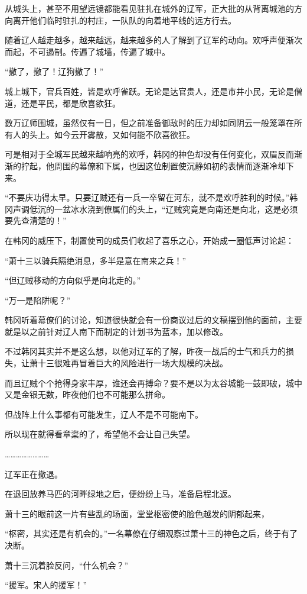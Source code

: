 从城头上，甚至不用望远镜都能看见驻扎在城外的辽军，正大批的从背离城池的方向离开他们临时驻扎的村庄，一队队的向着地平线的远方行去。

随着辽人越走越多，越来越远，越来越多的人了解到了辽军的动向。欢呼声便渐次而起，不可遏制。传遍了城墙，传遍了城中。

“撤了，撤了！辽狗撤了！”

城上城下，官兵百姓，皆是欢呼雀跃。无论是达官贵人，还是市井小民，无论是僧道，还是平民，都是欣喜欲狂。

数万辽师围城，虽然仅有一日，但之前准备御敌时的压力却如同阴云一般笼罩在所有人的头上。如今云开雾散，又如何能不欣喜欲狂。

可是相对于全城军民越来越响亮的欢呼，韩冈的神色却没有任何变化，双眉反而渐渐的拧起，他周围的幕僚和下属，也因这位制置使沉静如初的表情而逐渐冷却下来。

“不要庆功得太早。只要辽贼还有一兵一卒留在河东，就不是欢呼胜利的时候。”韩冈声调低沉的一盆冰水浇到僚属们的头上，“辽贼究竟是向南还是向北，这是必须要先查清楚的！”

在韩冈的威压下，制置使司的成员们收起了喜乐之心，开始成一圈低声讨论起：

“萧十三以骑兵隔绝消息，多半是意在南来之兵！”

“但辽贼移动的方向似乎是向北走的。”

“万一是陷阱呢？”

韩冈听着幕僚们的讨论，知道很快就会有一份商议过后的文稿摆到他的面前，主要就是以之前针对辽人南下而制定的计划书为蓝本，加以修改。

不过韩冈其实并不是这么想，以他对辽军的了解，昨夜一战后的士气和兵力的损失，让萧十三很难再冒着巨大的风险进行一场大规模的决战。

而且辽贼个个抢得身家丰厚，谁还会再搏命？要不是以为太谷城能一鼓即破，城中又是金银无数，昨夜他们也不可能那么拼命。

但战阵上什么事都有可能发生，辽人不是不可能南下。

所以现在就得看章楶的了，希望他不会让自己失望。

……………………

辽军正在撤退。

在退回放养马匹的河畔绿地之后，便纷纷上马，准备启程北返。

萧十三的眼前这一片有些乱的场面，堂堂枢密使的脸色越发的阴郁起来，

“枢密，其实还是有机会的。”一名幕僚在仔细观察过萧十三的神色之后，终于有了决断。

萧十三沉着脸反问，“什么机会？”

“援军。宋人的援军！”

